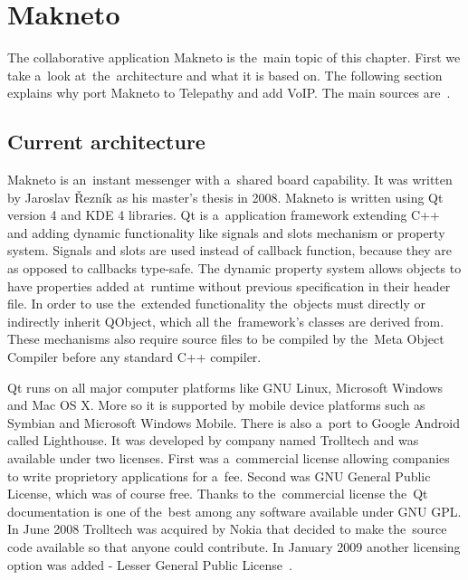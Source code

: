 \chapter{Makneto}\label{chapter:makneto}
The collaborative application Makneto is the~main topic of this chapter. First we take a~look at~the~architecture and what it is based on. The following section explains why port Makneto to Telepathy and add VoIP. The main sources are~\cite{makneto,qtBook,SVGtiny}. 
   
\section{Current architecture}
Makneto is an~instant messenger with a~shared board capability. It was written by Jaroslav Řezník as his master's thesis in 2008. Makneto is written using Qt version 4 and KDE 4 libraries. Qt is a~application framework extending C++ and adding dynamic functionality like signals and slots mechanism or property system. Signals and slots are used instead of callback function, because they are as opposed to callbacks type-safe. The dynamic property system allows objects to have properties added at~runtime without previous specification in their header file. In order to use the~extended functionality the~objects must directly or indirectly inherit QObject, which all the~framework's classes are derived from. These mechanisms also require source files to be compiled by the~Meta Object Compiler before any standard C++ compiler.

Qt runs on all major computer platforms like GNU Linux, Microsoft Windows and Mac OS X. More so it is supported by mobile device platforms such as Symbian and Microsoft Windows Mobile. There is also a~port to Google Android called Lighthouse. It was developed by company named Trolltech and was available under two licenses. First was a~commercial license allowing companies to write proprietory applications for a~fee. Second was GNU General Public License, which was of course free. Thanks to the~commercial license the~Qt documentation is one of the~best among any software available under GNU GPL. In June 2008 Trolltech was acquired by Nokia that decided to make the~source code available so that anyone could contribute. In January 2009 another licensing option was added - Lesser General Public License~\cite{qtBook,Qt}.

